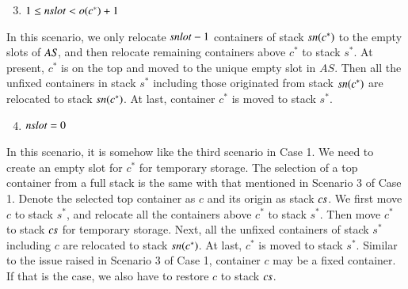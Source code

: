 \documentclass[review,3p,times,authoryear,12pt]{elsarticle}
\begin{document}
\begin{enumerate}
\setcounter{enumi}{2}
\item $1\le\id{nslot}< o(c^*)+1$
\end{enumerate}
In this scenario, we only relocate $\id{snlot}-1$ containers of stack $\id{sn}(c^*)$ to the empty slots of $\id{AS}$, and then relocate remaining containers above $c^*$ to stack $s^*$. At present, $c^*$ is on the top and moved to the unique empty slot in $AS$. Then all the unfixed containers in stack $s^*$ including those originated from stack $\id{sn}(c^*)$ are relocated to stack $\id{sn}(c^*)$. At last, container $c^*$ is moved to stack $s^*$.

\begin{enumerate}
\setcounter{enumi}{3}
\item $\id{nslot}=0$
\end{enumerate}
In this scenario, it is somehow like the third scenario in Case 1. We need to create an empty slot for $c^*$ for temporary storage. The selection of a top container from a full stack is the same with that mentioned in Scenario 3 of Case 1. Denote the selected top container as $c$ and its origin as stack $\id{cs}$. We first move $c$ to stack $s^*$, and relocate all the containers above $c^*$ to stack $s^*$. Then move $c^*$ to stack $\id{cs}$ for temporary storage. Next, all the unfixed containers of stack $s^*$ including $c$ are relocated to stack $\id{sn}(c^*)$. At last, $c^*$ is moved to stack $s^*$. Similar to the issue raised in Scenario 3 of Case 1, container $c$ may be a fixed container. If that is the case, we also have to restore $c$ to stack $\id{cs}$.
\end{document}
